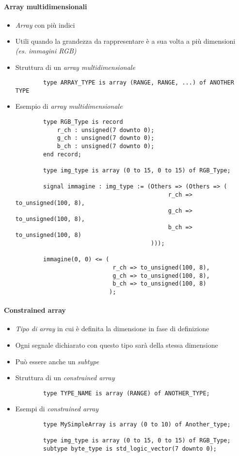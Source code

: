 \documentclass{article}
\begin{document}
\paragraph{Array multidimensionali}
\begin{itemize}
	\item \textit{Array} con più indici
	\item Utili quando la grandezza da rappresentare è a sua volta a più dimensioni \textit{(es. immagini RGB)}
	\item Struttura di un \textit{array multidimensionale}
	\begin{verbatim}
	    type ARRAY_TYPE is array (RANGE, RANGE, ...) of ANOTHER TYPE
	\end{verbatim}
	\item Esempio di \textit{array multidimensionale}
	\begin{verbatim}
	    type RGB_Type is record
	        r_ch : unsigned(7 downto 0);
	        g_ch : unsigned(7 downto 0);
	        b_ch : unsigned(7 downto 0);
	    end record;

	    type img_type is array (0 to 15, 0 to 15) of RGB_Type;
		
	    signal immagine : img_type := (Others => (Others => ( 
		                                    r_ch => to_unsigned(100, 8),
		                                    g_ch => to_unsigned(100, 8),
		                                    b_ch => to_unsigned(100, 8)
		                               )));
		
	    immagine(0, 0) <= ( 
	                        r_ch => to_unsigned(100, 8),
	                        g_ch => to_unsigned(100, 8),
	                        b_ch => to_unsigned(100, 8)
		                   );
	\end{verbatim}
\end{itemize}

\paragraph{Constrained array}
\begin{itemize}
	\item \textit{Tipo di array} in cui è definita la dimensione in fase di definizione
	\item Ogni segnale dichiarato con questo tipo sarà della stessa dimensione
	\item Può essere anche un \textit{subtype}
	\item Struttura di un \textit{constrained array}
	\begin{verbatim}
	    type TYPE_NAME is array (RANGE) of ANOTHER_TYPE;
	\end{verbatim}
	\item Esempi di \textit{constrained array}
	\begin{verbatim}
	    type MySimpleArray is array (0 to 10) of Another_type;
	    
	    type img_type is array (0 to 15, 0 to 15) of RGB_Type;
	    subtype byte_type is std_logic_vector(7 downto 0);
	\end{verbatim}
\end{itemize}
\end{document}
